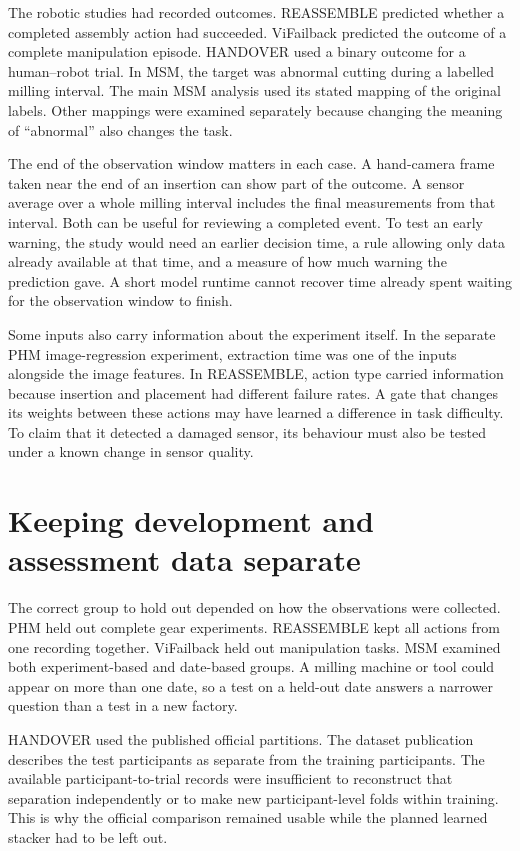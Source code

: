 The robotic studies had recorded outcomes. REASSEMBLE predicted whether a completed
assembly action had succeeded. ViFailback predicted the outcome of a complete
manipulation episode. HANDOVER used a binary outcome for a human–robot trial. In MSM,
the target was abnormal cutting during a labelled milling interval. The main MSM
analysis used its stated mapping of the original labels. Other mappings were examined
separately because changing the meaning of “abnormal” also changes the task.

The end of the observation window matters in each case. A hand-camera frame taken near
the end of an insertion can show part of the outcome. A sensor average over a whole
milling interval includes the final measurements from that interval. Both can be useful
for reviewing a completed event. To test an early warning, the study would need an
earlier decision time, a rule allowing only data already available at that time, and a
measure of how much warning the prediction gave. A short model runtime cannot recover
time already spent waiting for the observation window to finish.

Some inputs also carry information about the experiment itself. In the separate PHM
image-regression experiment, extraction time was one of the inputs alongside the image
features. In REASSEMBLE, action type carried information because insertion and placement
had different failure rates. A gate that changes its weights between these actions may
have learned a difference in task difficulty. To claim that it detected a damaged
sensor, its behaviour must also be tested under a known change in sensor quality.

\section{Keeping development and assessment data separate}
\label{sec:ch4-assessment}

The correct group to hold out depended on how the observations were collected. PHM held
out complete gear experiments. REASSEMBLE kept all actions from one recording together.
ViFailback held out manipulation tasks. MSM examined both experiment-based and
date-based groups. A milling machine or tool could appear on more than one date, so a
test on a held-out date answers a narrower question than a test in a new factory.

HANDOVER used the published official partitions. The dataset publication describes the
test participants as separate from the training participants. The available
participant-to-trial records were insufficient to reconstruct that separation
independently or to make new participant-level folds within training. This is why the
official comparison remained usable while the planned learned stacker had to be left
out.

